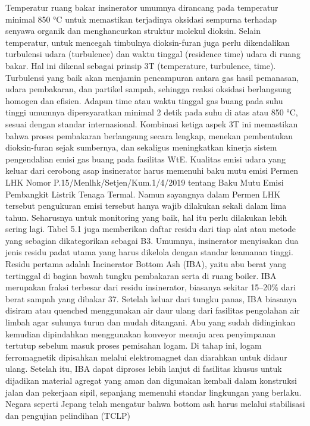 \documentclass[
  letterpaper,
  DIV=11,
  numbers=noendperiod]{scrreprt}
\begin{document}
Temperatur ruang bakar insinerator umumnya dirancang pada temperatur
minimal 850 °C untuk memastikan terjadinya oksidasi sempurna terhadap
senyawa organik dan menghancurkan struktur molekul dioksin. Selain
temperatur, untuk mencegah timbulnya dioksin-furan juga perlu
dikendalikan turbulensi udara (turbulence) dan waktu tinggal (residence
time) udara di ruang bakar. Hal ini dikenal sebagai prinsip 3T
(temperature, turbulence, time). Turbulensi yang baik akan menjamin
pencampuran antara gas hasil pemanasan, udara pembakaran, dan partikel
sampah, sehingga reaksi oksidasi berlangsung homogen dan efisien. Adapun
time atau waktu tinggal gas buang pada suhu tinggi umumnya
dipersyaratkan minimal 2 detik pada suhu di atas atau 850 °C, sesuai
dengan standar internasional. Kombinasi ketiga aspek 3T ini memastikan
bahwa proses pembakaran berlangsung secara lengkap, menekan pembentukan
dioksin-furan sejak sumbernya, dan sekaligus meningkatkan kinerja sistem
pengendalian emisi gas buang pada fasilitas WtE. Kualitas emisi udara
yang keluar dari cerobong asap insinerator harus memenuhi baku mutu
emisi Permen LHK Nomor P.15/Menlhk/Setjen/Kum.1/4/2019 tentang Baku Mutu
Emisi Pembangkit Listrik Tenaga Termal. Namun sayangnya dalam Permen LHK
tersebut pengukuran emisi tersebut hanya wajib dilakukan sekali dalam
lima tahun. Seharusnya untuk monitoring yang baik, hal itu perlu
dilakukan lebih sering lagi. Tabel 5.1 juga memberikan daftar residu
dari tiap alat atau metode yang sebagian dikategorikan sebagai B3.
Umumnya, insinerator menyisakan dua jenis residu padat utama yang harus
dikelola dengan standar keamanan tinggi. Residu pertama adalah
Incinerator Bottom Ash (IBA), yaitu abu berat yang tertinggal di bagian
bawah tungku pembakaran serta di ruang boiler. IBA merupakan fraksi
terbesar dari residu insinerator, biasanya sekitar 15--20\% dari berat
sampah yang dibakar 37. Setelah keluar dari tungku panas, IBA biasanya
disiram atau quenched menggunakan air daur ulang dari fasilitas
pengolahan air limbah agar suhunya turun dan mudah ditangani. Abu yang
sudah didinginkan kemudian dipindahkan menggunakan konveyor menuju area
penyimpanan tertutup sebelum masuk proses pemisahan logam. Di tahap ini,
logam ferromagnetik dipisahkan melalui elektromagnet dan diarahkan untuk
didaur ulang. Setelah itu, IBA dapat diproses lebih lanjut di fasilitas
khusus untuk dijadikan material agregat yang aman dan digunakan kembali
dalam konstruksi jalan dan pekerjaan sipil, sepanjang memenuhi standar
lingkungan yang berlaku. Negara seperti Jepang telah mengatur bahwa
bottom ash harus melalui stabilisasi dan pengujian pelindihan (TCLP)
\end{document}
